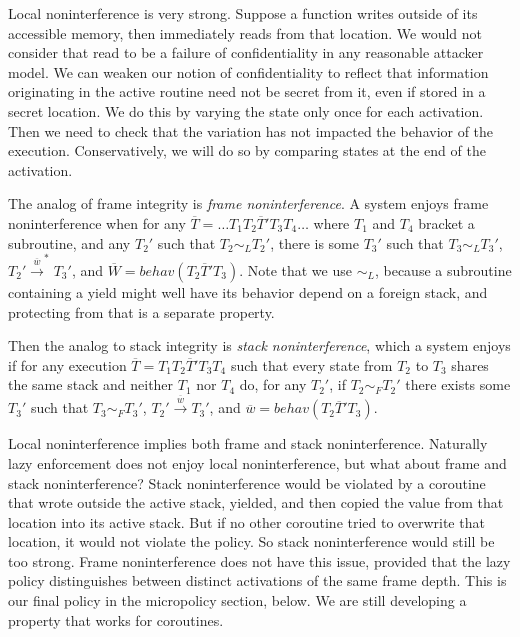 \documentclass{article}
\begin{document}
      Local noninterference is very strong. Suppose a function writes outside of its
      accessible memory, then immediately reads from that location. We would not consider that read to
      be a failure of confidentiality in any reasonable attacker model. We can weaken our notion of
      confidentiality to reflect that information originating in the active routine need not be secret
      from it, even if stored in a secret location. We do this by varying the state only once
      for each activation. Then we need to check that the variation has not impacted the behavior of
      the execution. Conservatively, we will do so by comparing states at the end of the activation.

      The analog of frame integrity is {\it frame noninterference}. A system enjoys frame noninterference when
      for any \(\overline{T} = \dots T_1 T_2 \overline{T}' T_3 T_4 \dots\) where \(T_1\) and \(T_4\) bracket a
      subroutine, and any \(T_2'\) such that \(T_2 \sim_L T_2'\), there is some \(T_3'\) such that
      \(T_3 \sim_L T_3'\), \(T_2' \xrightarrow{\overline{w}}^* T_3'\), and \(\overline{W} =
      \mathit{behav}(T_2 \overline{T}' T_3)\). Note that we use \(\sim_L\), because a subroutine containing a yield
      might well have its behavior depend on a foreign stack, and protecting from that is a separate property.
      
      Then the analog to stack integrity is {\it stack noninterference}, which a system enjoys if for any
      execution \(\overline{T} = T_1 T_2 \overline{T}' T_3 T_4\) such that every state from \(T_2\) to \(T_3\)
      shares the same stack and neither \(T_1\) nor \(T_4\) do, for any \(T_2'\), if \(T_2 \sim_F T_2'\)
      there exists some \(T_3'\) such that \(T_3 \sim_F T_3'\), \(T_2' \xrightarrow{\overline{w}} T_3'\), and
      \(\overline{w} = \mathit{behav}(T_2 \overline{T}' T_3)\).

      Local noninterference implies both frame and stack noninterference. Naturally lazy enforcement
      does not enjoy local noninterference, but what about frame and stack noninterference? Stack noninterference
      would be violated by a coroutine that wrote outside the active stack, yielded, and then
      copied the value from that location into its active stack. But if no other coroutine tried to overwrite
      that location, it would not violate the policy. So stack noninterference would still be too strong.
      Frame noninterference does not have this issue, provided that the lazy policy distinguishes between
      distinct activations of the same frame depth. This is our final policy in the micropolicy section, below.
      We are still developing a property that works for coroutines.
\end{document}
